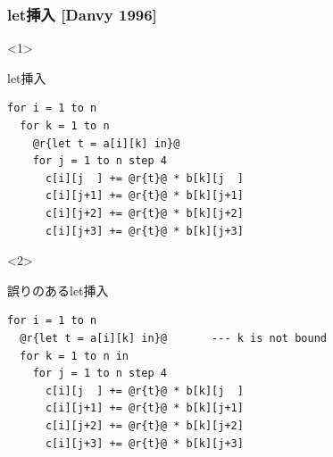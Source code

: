 \documentclass[dvipdfmx,cjk,xcolor=dvipsnames,envcountsect,notheorems,12pt]{beamer}
\theoremstyle{definition}
\begin{document}
\begin{frame}[fragile]
  \frametitle{let挿入 [Danvy 1996]}

  \begin{onlyenv}<1>
    \begin{exampleblock}{let挿入}
\begin{lstlisting}
for i = 1 to n
  for k = 1 to n
    @r{let t = a[i][k] in}@
    for j = 1 to n step 4
      c[i][j  ] += @r{t}@ * b[k][j  ]
      c[i][j+1] += @r{t}@ * b[k][j+1]
      c[i][j+2] += @r{t}@ * b[k][j+2]
      c[i][j+3] += @r{t}@ * b[k][j+3]
\end{lstlisting}
    \end{exampleblock}
  \end{onlyenv}

  \begin{onlyenv}<2>
    \begin{exampleblock}{誤りのあるlet挿入}
\begin{lstlisting}
for i = 1 to n
  @r{let t = a[i][k] in}@       --- k is not bound
  for k = 1 to n in
    for j = 1 to n step 4
      c[i][j  ] += @r{t}@ * b[k][j  ]
      c[i][j+1] += @r{t}@ * b[k][j+1]
      c[i][j+2] += @r{t}@ * b[k][j+2]
      c[i][j+3] += @r{t}@ * b[k][j+3]
\end{lstlisting}
    \end{exampleblock}
  \end{onlyenv}
\end{frame}


\end{document}
